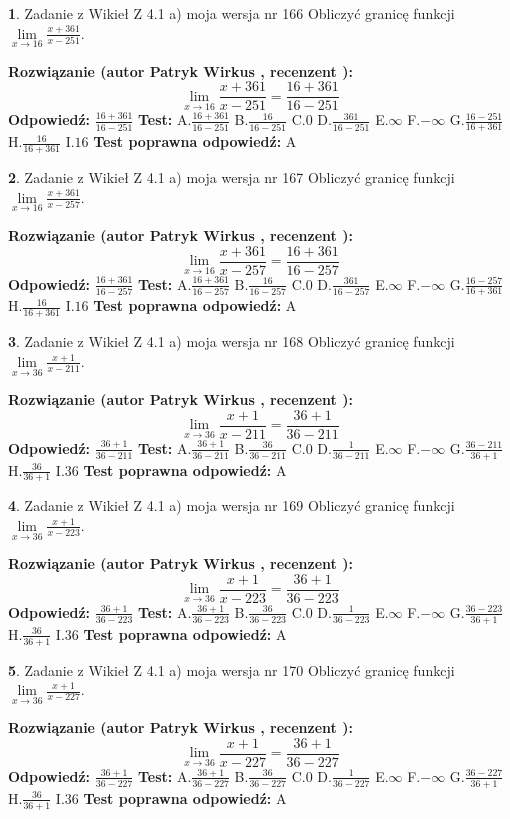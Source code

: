 \documentclass[12pt, a4paper]{article}
\theoremstyle{definition} %
\newtheorem{zad}{}
\newcommand{\zadStart}[1]{\begin{zad}#1\newline}
\newcommand{\zadStop}{\end{zad}}
\newcommand{\rozwStart}[2]{\noindent \textbf{Rozwiązanie (autor #1 , recenzent #2): }\newline}
\newcommand{\rozwStop}{\newline}
\newcommand{\odpStart}{\noindent \textbf{Odpowiedź:}\newline}
\newcommand{\odpStop}{\newline}
\newcommand{\testStart}{\noindent \textbf{Test:}\newline}
\newcommand{\testStop}{\newline}
\newcommand{\kluczStart}{\noindent \textbf{Test poprawna odpowiedź:}\newline}
\newcommand{\kluczStop}{\newline}
\begin{document}
\zadStart{Zadanie z Wikieł Z 4.1 a) moja wersja nr 166}
Obliczyć granicę funkcji $\lim\limits_{x\to16}\frac{x+361}{x-251}$.
\zadStop
\rozwStart{Patryk Wirkus}{}
$$\lim\limits_{x\to16}\frac{x+361}{x-251} = \frac{16+361}{16-251}$$
\rozwStop
\odpStart
$\frac{16+361}{16-251}$
\odpStop
\testStart
A.$\frac{16+361}{16-251}$
B.$\frac{16}{16-251}$
C.$0$
D.$\frac{361}{16-251}$
E.$\infty$
F.$-\infty$
G.$\frac{16-251}{16+361}$
H.$\frac{16}{16+361}$
I.$16$
\testStop
\kluczStart
A
\kluczStop



\zadStart{Zadanie z Wikieł Z 4.1 a) moja wersja nr 167}
Obliczyć granicę funkcji $\lim\limits_{x\to16}\frac{x+361}{x-257}$.
\zadStop
\rozwStart{Patryk Wirkus}{}
$$\lim\limits_{x\to16}\frac{x+361}{x-257} = \frac{16+361}{16-257}$$
\rozwStop
\odpStart
$\frac{16+361}{16-257}$
\odpStop
\testStart
A.$\frac{16+361}{16-257}$
B.$\frac{16}{16-257}$
C.$0$
D.$\frac{361}{16-257}$
E.$\infty$
F.$-\infty$
G.$\frac{16-257}{16+361}$
H.$\frac{16}{16+361}$
I.$16$
\testStop
\kluczStart
A
\kluczStop



\zadStart{Zadanie z Wikieł Z 4.1 a) moja wersja nr 168}
Obliczyć granicę funkcji $\lim\limits_{x\to36}\frac{x+1}{x-211}$.
\zadStop
\rozwStart{Patryk Wirkus}{}
$$\lim\limits_{x\to36}\frac{x+1}{x-211} = \frac{36+1}{36-211}$$
\rozwStop
\odpStart
$\frac{36+1}{36-211}$
\odpStop
\testStart
A.$\frac{36+1}{36-211}$
B.$\frac{36}{36-211}$
C.$0$
D.$\frac{1}{36-211}$
E.$\infty$
F.$-\infty$
G.$\frac{36-211}{36+1}$
H.$\frac{36}{36+1}$
I.$36$
\testStop
\kluczStart
A
\kluczStop



\zadStart{Zadanie z Wikieł Z 4.1 a) moja wersja nr 169}
Obliczyć granicę funkcji $\lim\limits_{x\to36}\frac{x+1}{x-223}$.
\zadStop
\rozwStart{Patryk Wirkus}{}
$$\lim\limits_{x\to36}\frac{x+1}{x-223} = \frac{36+1}{36-223}$$
\rozwStop
\odpStart
$\frac{36+1}{36-223}$
\odpStop
\testStart
A.$\frac{36+1}{36-223}$
B.$\frac{36}{36-223}$
C.$0$
D.$\frac{1}{36-223}$
E.$\infty$
F.$-\infty$
G.$\frac{36-223}{36+1}$
H.$\frac{36}{36+1}$
I.$36$
\testStop
\kluczStart
A
\kluczStop



\zadStart{Zadanie z Wikieł Z 4.1 a) moja wersja nr 170}
Obliczyć granicę funkcji $\lim\limits_{x\to36}\frac{x+1}{x-227}$.
\zadStop
\rozwStart{Patryk Wirkus}{}
$$\lim\limits_{x\to36}\frac{x+1}{x-227} = \frac{36+1}{36-227}$$
\rozwStop
\odpStart
$\frac{36+1}{36-227}$
\odpStop
\testStart
A.$\frac{36+1}{36-227}$
B.$\frac{36}{36-227}$
C.$0$
D.$\frac{1}{36-227}$
E.$\infty$
F.$-\infty$
G.$\frac{36-227}{36+1}$
H.$\frac{36}{36+1}$
I.$36$
\testStop
\kluczStart
A
\kluczStop
\end{document}
